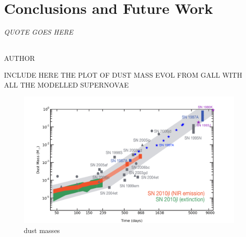 \chapter{Conclusions and Future Work}\label{chp:chp7}

\begin{flushright}
  {\em QUOTE GOES HERE }\\

\ \

\normalsize
{AUTHOR}  
\end{flushright}



INCLUDE HERE THE PLOT OF DUST MASS EVOL FROM GALL WITH ALL THE MODELLED SUPERNOVAE


\begin{figure}
\centering
\includegraphics[scale=0.5,clip=true, trim=50 0 60 30]{chapters/chapter7/figs/final_dust_plot.png}
\caption{dust masses}
\label{shifted}
\end{figure}